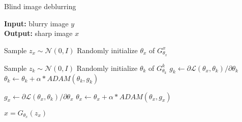 \documentclass[final]{cvpr}
\begin{document}
\begin{algorithm}[t]
    \caption{Blind image deblurring}
    \label {algo:imagedeblurring}
    
    \textbf{Input:} blurry image $y$ \\
    \textbf{Output:} sharp image $x$
    \begin{algorithmic}[1]
        \State Sample $z_x \sim \mathcal{N}(0, I)$
        \State Randomly initialize $\theta_x$ of $G^{x}_{\theta_x}$
    
            \State Sample $z_k \sim \mathcal{N}(0, I)$    
            \State Randomly initialize $\theta_k$ of $G^{k}_{\theta_k}$
                \State $g_k \leftarrow \partial \mathcal{L}(\theta_x, \theta_k) / \partial \theta_k$
                \State $\theta_k \leftarrow \theta_k + \alpha * ADAM(\theta_k, g_k)$
            \EndWhile
            
            
            \State $g_x \leftarrow \partial \mathcal{L}(\theta_x, \theta_k) / \partial \theta_x$
            \State $\theta_x \leftarrow \theta_x + \alpha * ADAM(\theta_x, g_x)$
        \EndWhile
        
        \State $x = G_{\theta_x}(z_x)$
    \end{algorithmic}
\end{algorithm}

        
\end{document}
